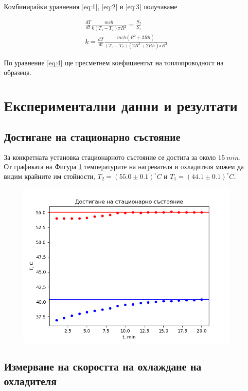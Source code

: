\documentclass[reprint,amsmath,amssymb,aps,floatfix]{revtex4-2}
\newcommand{\degree}{^{\circ}}
\begin{document}
Комбинирайки уравнения \eqref{eq:1}, \eqref{eq:2} и \eqref{eq:3} получаваме 


\begin{gather*}
    \frac{dT}{dt} \frac{mc h}{k (T_1 - T_2) \pi R^2} = \frac{S_2}{S_1} \\
    k = \frac{dT}{dt} \frac{mc h ( R^2 + 2 Rh)}{(T_1 - T_2) (2 R^2 + 2 Rh) \pi R^2} \label{eq:4} \tag{4}
\end{gather*}

По уравнение \eqref{eq:4} ще пресметнем коефициентът на топлопроводност на образеца. 

\section{Експериментални данни и резултати}
\subsection{Достигане на стационарно състояние}

За конкретната установка стационарното състояние се достига за около $15 \ \si{min}$. От графиката на Фигура \ref{fig:1} температурите на нагревателя и охладителя можем да видим крайните им стойности, $T_2 = (55.0 \pm 0.1) \degree C$ и $T_1 = (44.1 \pm 0.1) \degree C$. 

\begin{figure}[H] 
    \centering
    \includegraphics[width=\columnwidth, keepaspectratio=true]{graph_statz.png}
    \caption{}
    \label{fig:1}
\end{figure}

\subsection{Измерване на скоростта на охлаждане на охладителя}
\end{document}
